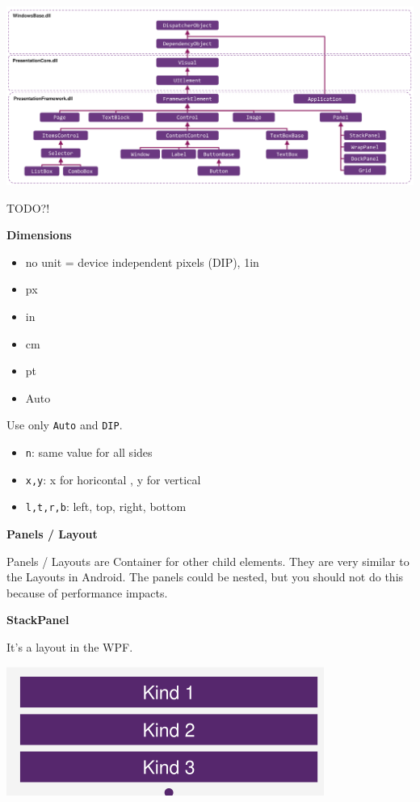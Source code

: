 \documentclass[10pt,twoside,landscape]{article}
\begin{document}
\begin{multicols}{3}
\begin{center}
\includegraphics[width=.9\linewidth]{img/class_hierarchy.png}
\end{center}

TODO?!

\textbf{Dimensions}

\begin{itemize}
\item no unit = device independent pixels (DIP), 1in
\item px
\item in
\item cm
\item pt
\item Auto
\end{itemize}

Use only \texttt{Auto} and \texttt{DIP}.
\begin{itemize}
\item \texttt{n}: same value for all sides
\item \texttt{x,y}: x for horicontal , y for vertical
\item \texttt{l,t,r,b}: left, top, right, bottom
\end{itemize}

\textbf{Panels / Layout}

Panels / Layouts are Container for other child elements.
They are very similar to the Layouts in Android.
The panels could be nested, but you should not do this because of performance impacts.

\textbf{StackPanel}

It's a layout in the WPF.

\begin{center}
\includegraphics[width=.9\linewidth]{img/stack_panel_vertical.png}
\end{center}


\end{multicols}
\end{document}

